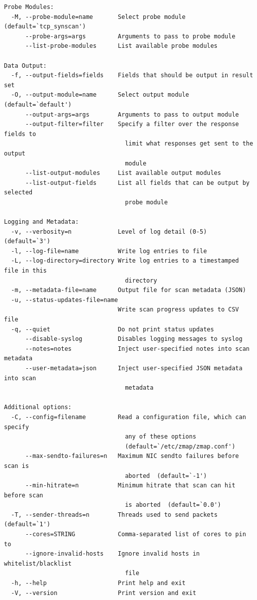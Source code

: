 \documentclass{article}
\begin{document}
\begin{lstlisting}
Probe Modules:
  -M, --probe-module=name       Select probe module  (default=`tcp_synscan')
      --probe-args=args         Arguments to pass to probe module
      --list-probe-modules      List available probe modules

Data Output:
  -f, --output-fields=fields    Fields that should be output in result set
  -O, --output-module=name      Select output module  (default=`default')
      --output-args=args        Arguments to pass to output module
      --output-filter=filter    Specify a filter over the response fields to
                                  limit what responses get sent to the output
                                  module
      --list-output-modules     List available output modules
      --list-output-fields      List all fields that can be output by selected
                                  probe module

Logging and Metadata:
  -v, --verbosity=n             Level of log detail (0-5)  (default=`3')
  -l, --log-file=name           Write log entries to file
  -L, --log-directory=directory Write log entries to a timestamped file in this
                                  directory
  -m, --metadata-file=name      Output file for scan metadata (JSON)
  -u, --status-updates-file=name
                                Write scan progress updates to CSV file
  -q, --quiet                   Do not print status updates
      --disable-syslog          Disables logging messages to syslog
      --notes=notes             Inject user-specified notes into scan metadata
      --user-metadata=json      Inject user-specified JSON metadata into scan
                                  metadata

Additional options:
  -C, --config=filename         Read a configuration file, which can specify
                                  any of these options
                                  (default=`/etc/zmap/zmap.conf')
      --max-sendto-failures=n   Maximum NIC sendto failures before scan is
                                  aborted  (default=`-1')
      --min-hitrate=n           Minimum hitrate that scan can hit before scan
                                  is aborted  (default=`0.0')
  -T, --sender-threads=n        Threads used to send packets  (default=`1')
      --cores=STRING            Comma-separated list of cores to pin to
      --ignore-invalid-hosts    Ignore invalid hosts in whitelist/blacklist
                                  file
  -h, --help                    Print help and exit
  -V, --version                 Print version and exit


\end{lstlisting}
\end{document}
